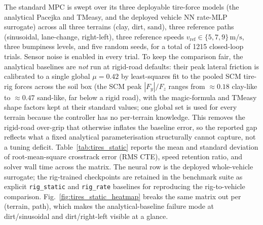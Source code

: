 \documentclass[conference,letterpaper,10pt]{IEEEtran}
\begin{document}
The standard MPC is swept over its three deployable tire-force models
(the analytical Pacejka and TMeasy, and the deployed vehicle NN rate-MLP
surrogate) across all
three terrains (clay, dirt, sand), three reference paths (sinusoidal,
lane-change, right-left), three reference speeds
$v_{\mathrm{ref}}\in\{5,7,9\}\,\mathrm{m/s}$, three bumpiness levels,
and five random seeds, for a total of 1215 closed-loop trials. Sensor
noise is enabled in every trial. To keep the comparison fair, the
analytical baselines are \emph{not} run at rigid-road defaults: their
peak lateral friction is calibrated to a single global $\mu=0.42$ by
least-squares fit to the pooled SCM tire-rig forces across the soil box
(the SCM peak $|F_y|/F_z$ ranges from $\approx 0.18$ clay-like to
$\approx 0.47$ sand-like, far below a rigid road), with the
magic-formula and TMeasy shape factors kept at their standard values;
one global set is used for every terrain because the controller has no
per-terrain knowledge. This removes the rigid-road over-grip that
otherwise inflates the baseline error, so the reported gap reflects what
a fixed analytical parameterisation structurally cannot capture, not a
tuning deficit.
Table~\ref{tab:tires_static} reports the mean and standard deviation
of root-mean-square crosstrack error (RMS CTE), speed retention
ratio, and solver wall time across the matrix. The neural row is the
deployed whole-vehicle surrogate; the rig-trained checkpoints are
retained in the benchmark suite as explicit \texttt{rig\_static} and
\texttt{rig\_rate} baselines for reproducing the rig-to-vehicle
comparison. Fig.~\ref{fig:tires_static_heatmap} breaks the same matrix
out per (terrain, path), which makes the analytical-baseline failure
mode at dirt/sinusoidal and dirt/right-left visible at a glance.
\end{document}
